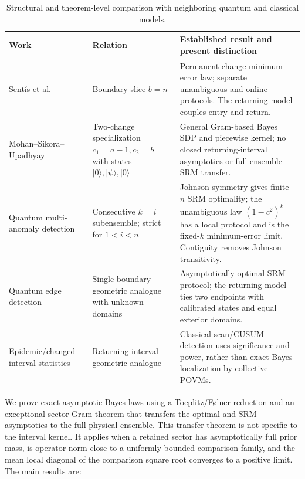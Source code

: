 \begin{table}[t]
\centering
\caption{Structural and theorem-level comparison with neighboring quantum and
classical models.}
\label{tab:literature}
\footnotesize
\begin{tabularx}{\textwidth}{@{}
>{\raggedright\arraybackslash}p{}
>{\raggedright\arraybackslash}p{}
>{\raggedright\arraybackslash}X@{}}
\toprule
Work & Relation & Established result and present distinction \\
\midrule
Sentís et al.~\cite{sentis2016,sentis2017,sentis2018}
& Boundary slice \(b=n\)
& Permanent-change minimum-error law; separate unambiguous and online
protocols. The returning model couples entry and return. \\
Mohan--Sikora--Upadhyay \cite{mohan2023}
& Two-change specialization \(c_1=a-1,c_2=b\) with states
\(\lvert0\rangle,\lvert\psi\rangle,\lvert0\rangle\)
& General Gram-based Bayes SDP and piecewise kernel; no closed
returning-interval asymptotics or full-ensemble SRM transfer. \\
Quantum multi-anomaly detection \cite{llorens2024}
& Consecutive \(k=i\) subensemble; strict for \(1<i<n\)
& Johnson symmetry gives finite-\(n\) SRM optimality; the unambiguous law
\((1-c^2)^k\) has a local protocol and is the fixed-\(k\) minimum-error limit.
Contiguity removes Johnson transitivity. \\
Quantum edge detection \cite{llorens2025}
& Single-boundary geometric analogue with unknown domains
& Asymptotically optimal SRM protocol; the returning model ties two endpoints
with calibrated states and equal exterior domains. \\
Epidemic/changed-interval statistics \cite{levin1985,yao1993,walther2010,chen2015}
& Returning-interval geometric analogue
& Classical scan/CUSUM detection uses significance and power, rather than
exact Bayes localization by collective POVMs. \\
\bottomrule
\end{tabularx}
\end{table}

We prove exact asymptotic Bayes laws using a Toeplitz/Følner reduction
\cite{gray2006,tilli1998,tyrtyshnikov1998} and an exceptional-sector Gram
theorem that transfers the optimal and SRM asymptotics to the full physical
ensemble. This transfer theorem is not specific to the interval kernel. It
applies when a retained sector has asymptotically full prior mass, is
operator-norm close to a uniformly bounded comparison family, and the mean
local diagonal of the comparison square root converges to a positive limit.
The main results are:

